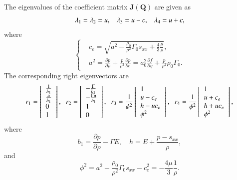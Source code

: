 \documentclass[review]{elsarticle}
\begin{document}
The eigenvalues of the coefficient matrix $\mathbf{J}(\mathbf{Q})$ are given as
\begin{equation}
  \lambda_1 =\lambda_2 = u, \hspace{0.3cm} \lambda_3 = u-c, \hspace{0.3cm} \lambda_4 = u+c,
\end{equation}
where
\begin{equation}\label{eq:c_e}
  \left\{ \begin{aligned}
      & c_e = \sqrt{a^2-\frac{\rho_0}{\rho^2}\Gamma_0 s_{xx} +\frac{4}{3}\frac{\mu}{\rho}},\\
    &   a^2 = \frac{\partial p}{\partial \rho} + \frac{p}{\rho^2}\frac{\partial p}{\partial e} = a^2_0 \frac{\partial f}{\partial \eta} + \frac{p}{\rho^2}\rho_0 \Gamma_0.
      \end{aligned} \right.
    \end{equation}
The corresponding right eigenvectors are
\begin{equation}\label{eq:eiv}
  r_1 = \left[ \begin{array}{l}
      \frac{1}{b_1} \\
      \frac{u}{b_1} \\
      0 \\
      1 \\
    \end{array}
    \right], \hspace{0.2cm}
    r_2= \left[ \begin{array}{l}
        -\frac{\Gamma}{b_1} \\
        -\frac{\Gamma u}{b_1} \\
        1 \\
        0\\
      \end{array}
    \right], \hspace{0.2cm}
r_3 =   \frac{1}{\phi^2}\left[\begin{array}{l}
        1 \\
        u-c_e \\
        h -uc_e \\
        \phi^2
      \end{array}
    \right], \hspace{0.2cm}
r_4 = \frac{1}{\phi^2}\left[\begin{array}{l}
        1 \\
        u+c_e \\
        h +uc_e \\
        \phi^2
      \end{array}
    \right],
  \end{equation}
  where
  \begin{equation}
    b_1 = \frac{\partial p}{\partial \rho} - \Gamma E,  \quad h = E +\frac{p-s_{xx}}{\rho},
  \end{equation}
  and
  \begin{equation}
    \phi^2 = a^2 -\frac{\rho_0}{\rho^2} \Gamma_0 s_{xx}-c_e^2 = -\frac{4\mu}{3}\frac{1}{\rho}.
  \end{equation}
\end{document}
